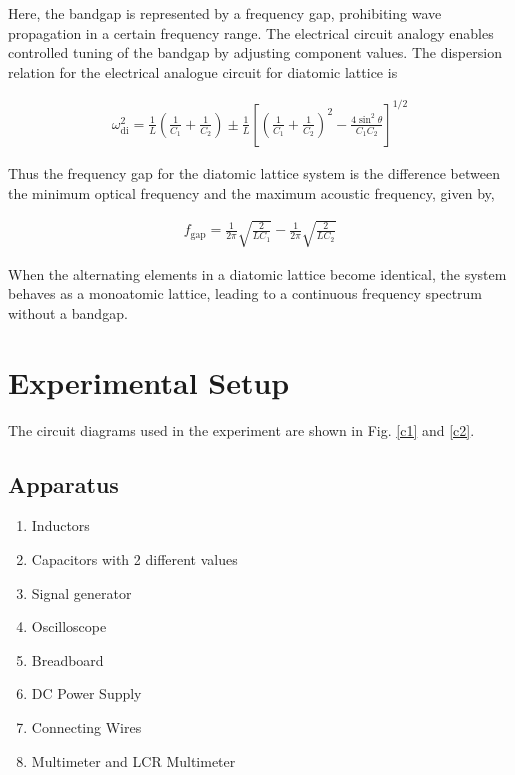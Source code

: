 Here, the bandgap is represented by a frequency gap, prohibiting wave propagation in a certain
frequency range. The electrical circuit analogy enables
controlled tuning of the bandgap by adjusting component
values. The dispersion relation for the electrical analogue
circuit for diatomic lattice is

\begin{align}
    \omega_\text{di}^2 = \frac{1}{L}\left(\frac{1}{C_1}+\frac{1}{C_2}\right) \pm \frac{1}{L} \left[\left(\frac{1}{C_1}+\frac{1}{C_2}\right)^2 - \frac{4\sin^2 \theta}{C_1C_2}\right]^{1/2}
\end{align}

Thus the frequency gap for the diatomic lattice system is the difference between the minimum optical frequency and the maximum acoustic frequency, given by,

\begin{align} \label{wf2}
    f_\text{gap} = \frac{1}{2\pi}\sqrt{\frac{2}{LC_1}} - \frac{1}{2\pi}\sqrt{\frac{2}{LC_2}}
\end{align}

When the alternating elements in a diatomic lattice become identical, the system behaves as a monoatomic lattice, leading to a continuous frequency spectrum without a bandgap.


\section{Experimental Setup}
The circuit diagrams used in the experiment are shown in Fig. \ref{c1} and \ref{c2}.

\subsection*{Apparatus}

\begin{enumerate}
    \item Inductors
    \item Capacitors with 2 different values
    \item Signal generator
    \item Oscilloscope
    \item Breadboard
    \item DC Power Supply
    \item Connecting Wires
    \item Multimeter and LCR Multimeter
\end{enumerate}

